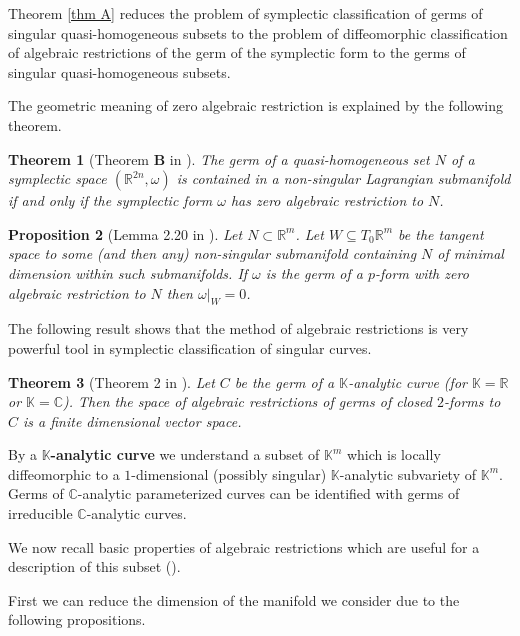 \documentclass{amsart}
\newtheorem{thm}{Theorem}[section]
\newtheorem{prop}[thm]{Proposition}
\theoremstyle{definition}
\numberwithin{equation}{section}
\begin{document}
\medskip

Theorem \ref{thm A} reduces the problem of symplectic
classification of germs of singular quasi-homogeneous subsets to
the problem of diffeomorphic classification of algebraic
restrictions of the germ of the symplectic form to the germs of
singular quasi-homogeneous subsets.

The geometric meaning of zero algebraic restriction is explained
by the following theorem.

\begin{thm}[Theorem {\bf B} in \cite{DJZ2}] \label{thm B}  {\it The germ of a quasi-homogeneous
 set $N$  of a symplectic space
$(\mathbb R^{2n}, \omega )$ is contained in a non-singular
Lagrangian submanifold if and only if the symplectic form $\omega
$ has zero algebraic restriction to $N$.}\
\end{thm}

\begin{prop}[Lemma 2.20 in \cite{DJZ2}]
\label{zero-at-zero} Let $N\subset \mathbb R^m$. Let $W\subseteq
T_0\mathbb R^m$ be the tangent space to some (and then any)
non-singular submanifold containing $N$ of minimal dimension
within such submanifolds. If $\omega $ is the germ of a $p$-form
with zero algebraic restriction to $N$ then $\omega \vert _W = 0$.
\end{prop}

The following result shows that the method of algebraic
restrictions is very powerful tool in symplectic classification of
singular curves.

\begin{thm}[Theorem 2 in \cite{D}]
\label{main-alg} Let $C$ be the germ of a $\mathbb K$-analytic
curve (for $\mathbb K=\mathbb R$ or $\mathbb K=\mathbb C$). Then
the space of algebraic restrictions of germs of closed $2$-forms
to $C$ is a finite dimensional vector space.
\end{thm}

By a {\bf $\mathbb K$-analytic curve} we understand a subset of
$\mathbb K^m$ which is locally diffeomorphic to a $1$-dimensional
(possibly singular) $\mathbb K$-analytic subvariety of $\mathbb
K^m$. Germs of $\mathbb C$-analytic parameterized curves can be
identified with germs of irreducible $\mathbb C$-analytic curves.

We now recall basic properties of
algebraic restrictions which are useful for a description of this
subset (\cite{DJZ2}).

First we can reduce the dimension of the manifold we consider due
to the following propositions.
\end{document}
